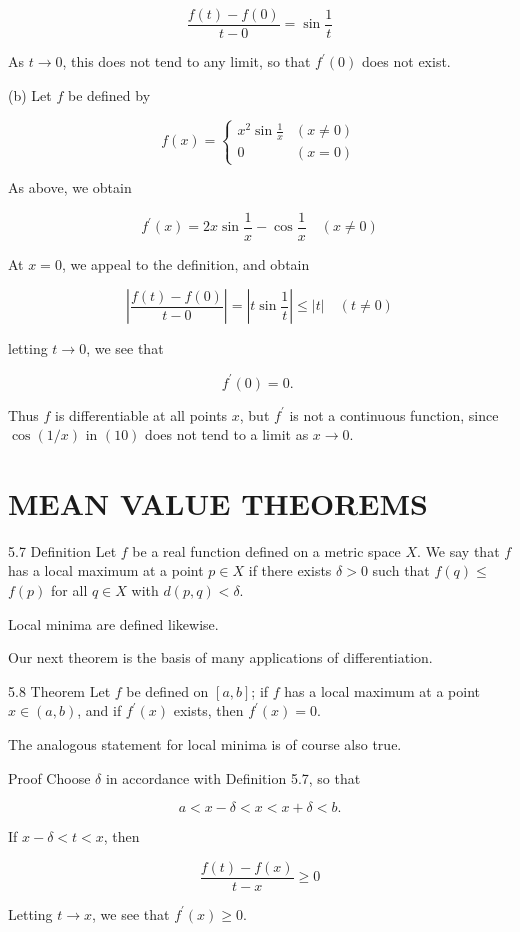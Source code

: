 \documentclass[10pt]{article}
\begin{document}
$$
\frac{f(t)-f(0)}{t-0}=\sin \frac{1}{t}
$$

As $t \rightarrow 0$, this does not tend to any limit, so that $f^{\prime}(0)$ does not exist.

(b) Let $f$ be defined by

$$
f(x)= \begin{cases}x^{2} \sin \frac{1}{x} & (x \neq 0) \\ 0 & (x=0)\end{cases}
$$

As above, we obtain

$$
f^{\prime}(x)=2 x \sin \frac{1}{x}-\cos \frac{1}{x} \quad(x \neq 0)
$$

At $x=0$, we appeal to the definition, and obtain

$$
\left|\frac{f(t)-f(0)}{t-0}\right|=\left|t \sin \frac{1}{t}\right| \leq|t| \quad(t \neq 0)
$$

letting $t \rightarrow 0$, we see that

$$
f^{\prime}(0)=0 \text {. }
$$

Thus $f$ is differentiable at all points $x$, but $f^{\prime}$ is not a continuous function, since $\cos (1 / x)$ in $(10)$ does not tend to a limit as $x \rightarrow 0$.

\section{MEAN VALUE THEOREMS}
5.7 Definition Let $f$ be a real function defined on a metric space $X$. We say that $f$ has a local maximum at a point $p \in X$ if there exists $\delta>0$ such that $f(q) \leq$ $f(p)$ for all $q \in X$ with $d(p, q)<\delta$.

Local minima are defined likewise.

Our next theorem is the basis of many applications of differentiation.

5.8 Theorem Let $f$ be defined on $[a, b]$; if $f$ has a local maximum at a point $x \in(a, b)$, and if $f^{\prime}(x)$ exists, then $f^{\prime}(x)=0$.

The analogous statement for local minima is of course also true.

Proof Choose $\delta$ in accordance with Definition 5.7, so that

$$
a<x-\delta<x<x+\delta<b .
$$

If $x-\delta<t<x$, then

$$
\frac{f(t)-f(x)}{t-x} \geq 0
$$

Letting $t \rightarrow x$, we see that $f^{\prime}(x) \geq 0$.
\end{document}
